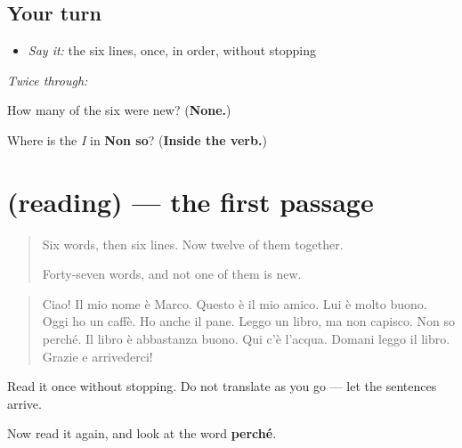 \subsection*{Your turn}
\begin{itemize}
\raggedright
  \item \emph{Say it:} the six lines, once, in order, without stopping
\end{itemize}

\emph{Twice through:}

\begin{tcolorbox}[breakable,colback=teal!4,colframe=teal!35!black,title={Before you move on}]
How many of the six were new? (\textbf{None.})

Where is the \emph{I} in \textbf{Non so}? (\textbf{Inside the verb.})
\end{tcolorbox}
\section[(reading)]{(reading) — the first passage}

\label{lesson:IT-C36-prima-lettura}



\begin{quote}
Six words, then six lines. Now twelve of them together.

Forty-seven words, and not one of them is new.
\end{quote}

\begin{tcolorbox}[breakable,skin=enhanced,colback=orange!6,colframe=orange!45!black,boxrule=0.5pt,arc=1mm,left=6pt,right=6pt,top=4pt,bottom=4pt,fonttitle=\bfseries,title={Read this}]
\begin{quote}
Ciao! Il mio nome è Marco. Questo è il mio amico. Lui è molto buono. Oggi ho un caffè. Ho anche il pane. Leggo un libro, ma non capisco. Non so perché. Il libro è abbastanza buono. Qui c'è l'acqua. Domani leggo il libro. Grazie e arrivederci!
\end{quote}

Read it once without stopping. Do not translate as you go — let the sentences arrive.

Now read it again, and look at the word \textbf{perché}.
\end{tcolorbox}

